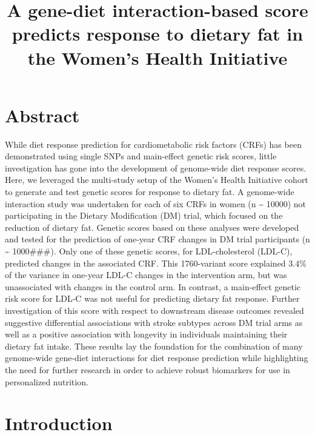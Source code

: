 \documentclass[]{article}
\title{A gene-diet interaction-based score predicts response to dietary fat in
the Women's Health Initiative}
\author{}
\date{}
\begin{document}
\maketitle

\hypertarget{abstract}{%
\section{Abstract}\label{abstract}}

While diet response prediction for cardiometabolic risk factors (CRFs)
has been demonstrated using single SNPs and main-effect genetic risk
scores, little investigation has gone into the development of
genome-wide diet response scores. Here, we leveraged the multi-study
setup of the Women's Health Initiative cohort to generate and test
genetic scores for response to dietary fat. A genome-wide interaction
study was undertaken for each of six CRFs in women (n \textasciitilde{}
10000) not participating in the Dietary Modification (DM) trial, which
focused on the reduction of dietary fat. Genetic scores based on these
analyses were developed and tested for the prediction of one-year CRF
changes in DM trial participants (n \textasciitilde{} 1000\#\#\#). Only
one of these genetic scores, for LDL-cholesterol (LDL-C), predicted
changes in the associated CRF. This 1760-variant score explained 3.4\%
of the variance in one-year LDL-C changes in the intervention arm, but
was unassociated with changes in the control arm. In contrast, a
main-effect genetic risk score for LDL-C was not useful for predicting
dietary fat response. Further investigation of this score with respect
to downstream disease outcomes revealed suggestive differential
associations with stroke subtypes across DM trial arms as well as a
positive association with longevity in individuals maintaining their
dietary fat intake. These results lay the foundation for the combination
of many genome-wide gene-diet interactions for diet response prediction
while highlighting the need for further research in order to achieve
robust biomarkers for use in personalized nutrition.

\hypertarget{introduction}{%
\section{Introduction}\label{introduction}}
\end{document}
